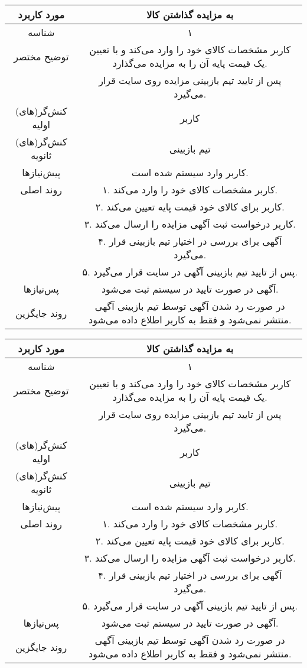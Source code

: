 \documentclass{article}
\begin{document}
\newpage
\begin{center}
\begin{tabular} { |c|c| }
\hline
 مورد کاربرد & 
 به مزایده گذاشتن کالا
\\ \hline
 شناسه &
۱
\\ \hline
توضیح مختصر &
کاربر مشخصات کالای خود را وارد می‌کند و با تعیین یک قیمت پایه آن را به مزایده می‌گذارد.
\\
&
پس از تایید تیم بازبینی مزایده روی سایت قرار می‌گیرد.
\\ \hline
کنش‌گر(های) اولیه &
کاربر
\\ \hline
کنش‌گر(های) ثانویه &
تیم بازبینی
\\ \hline
پیش‌نیازها &
کاربر وارد سیستم شده است.
\\ \hline
روند اصلی &
۱. کاربر مشخصات کالای خود را وارد می‌کند.
\\
&
۲. کاربر برای کالای خود قیمت پایه تعیین می‌کند.
\\
&
۳. کاربر درخواست ثبت آگهی مزایده را ارسال می‌کند.
\\
&
۴. آگهی برای بررسی در اختیار تیم بازبینی قرار می‌گیرد.
\\
&
۵. پس از تایید تیم بازبینی آگهی در سایت قرار می‌گیرد.
\\ \hline
پس‌نیازها &
آگهی در صورت تایید در سیستم ثبت می‌شود.
\\ \hline
روند جایگزین &
در صورت رد شدن آگهی توسط تیم بازبینی آگهی منتشر نمی‌شود و فقط به کاربر اطلاع داده می‌شود. 
\\ \hline
\end{tabular}
\end{center}


\newpage
\begin{center}
\begin{tabular} { |c|c| }
\hline
 مورد کاربرد & 
 به مزایده گذاشتن کالا
\\ \hline
 شناسه &
۱
\\ \hline
توضیح مختصر &
کاربر مشخصات کالای خود را وارد می‌کند و با تعیین یک قیمت پایه آن را به مزایده می‌گذارد.
\\
&
پس از تایید تیم بازبینی مزایده روی سایت قرار می‌گیرد.
\\ \hline
کنش‌گر(های) اولیه &
کاربر
\\ \hline
کنش‌گر(های) ثانویه &
تیم بازبینی
\\ \hline
پیش‌نیازها &
کاربر وارد سیستم شده است.
\\ \hline
روند اصلی &
۱. کاربر مشخصات کالای خود را وارد می‌کند.
\\
&
۲. کاربر برای کالای خود قیمت پایه تعیین می‌کند.
\\
&
۳. کاربر درخواست ثبت آگهی مزایده را ارسال می‌کند.
\\
&
۴. آگهی برای بررسی در اختیار تیم بازبینی قرار می‌گیرد.
\\
&
۵. پس از تایید تیم بازبینی آگهی در سایت قرار می‌گیرد.
\\ \hline
پس‌نیازها &
آگهی در صورت تایید در سیستم ثبت می‌شود.
\\ \hline
روند جایگزین &
در صورت رد شدن آگهی توسط تیم بازبینی آگهی منتشر نمی‌شود و فقط به کاربر اطلاع داده می‌شود. 
\\ \hline
\end{tabular}
\end{center}
\end{document}
